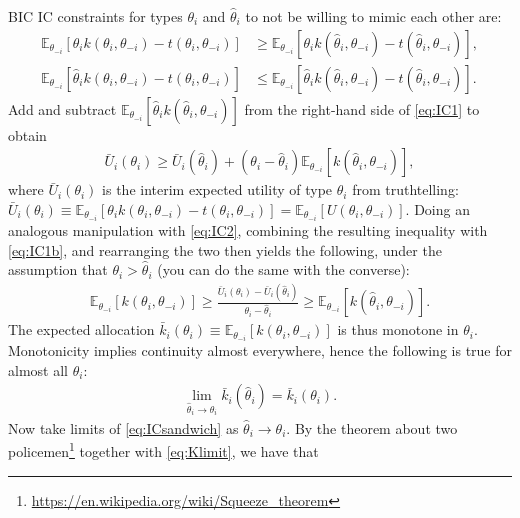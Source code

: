 \documentclass[a4paper]{article}
\begin{document}
	BIC IC constraints for types $\theta_i$ and $\hat{\theta}_i$ to not be willing to mimic each other are:
	\begin{align}
		\mathbb{E}_{\theta_{-i}}\left[ \theta_{i} k(\theta_i,\theta_{-i}) - t(\theta_i,\theta_{-i}) \right] &\geq 
		\mathbb{E}_{\theta_{-i}}\left[ \theta_{i} k(\hat{\theta}_i,\theta_{-i}) - t(\hat{\theta}_i,\theta_{-i}) \right],
		\label{eq:IC1}
		\\
		\mathbb{E}_{\theta_{-i}}\left[ \hat{\theta}_{i} k(\theta_i,\theta_{-i}) - t(\theta_i,\theta_{-i}) \right] &\leq 
		\mathbb{E}_{\theta_{-i}}\left[ \hat{\theta}_{i} k(\hat{\theta}_i,\theta_{-i}) - t(\hat{\theta}_i,\theta_{-i}) \right].
		\label{eq:IC2}
	\end{align}
	Add and subtract $\mathbb{E}_{\theta_{-i}}\left[ \hat{\theta}_{i} k(\hat{\theta}_i,\theta_{-i}) \right]$ from the right-hand side of \eqref{eq:IC1} to obtain
	\begin{align}
		\bar{U}_i(\theta_i) \geq \bar{U}_i(\hat{\theta}_i) + (\theta_i - \hat{\theta}_i) \mathbb{E}_{\theta_{-i}}\left[ k(\hat{\theta}_i,\theta_{-i}) \right], \label{eq:IC1b}
	\end{align}
	where $\bar{U}_i(\theta_i)$ is the interim expected utility of type $\theta_i$ from truthtelling: $\bar{U}_i(\theta_i) \equiv \mathbb{E}_{\theta_{-i}}\left[ \theta_{i} k(\theta_i,\theta_{-i}) - t(\theta_i,\theta_{-i}) \right] = \mathbb{E}_{\theta_{-i}}\left[ U(\theta_i,\theta_{-i}) \right]$.
	Doing an analogous manipulation with \eqref{eq:IC2}, combining the resulting inequality with \eqref{eq:IC1b}, and rearranging the two then yields the following, under the assumption that $\theta_i > \hat{\theta}_i$ (you can do the same with the converse):
	\begin{align}
		\mathbb{E}_{\theta_{-i}}\left[ k(\theta_i,\theta_{-i}) \right] \geq \frac{\bar{U}_i(\theta_i) - \bar{U}_i(\hat{\theta}_i)}{\theta_i - \hat{\theta}_i} \geq \mathbb{E}_{\theta_{-i}}\left[ k(\hat{\theta}_i,\theta_{-i}) \right] .
		\label{eq:ICsandwich}
	\end{align}
	The expected allocation $\bar{k}_i(\theta_i) \equiv \mathbb{E}_{\theta_{-i}}\left[ k(\theta_i,\theta_{-i}) \right]$ is thus monotone in $\theta_i$. Monotonicity implies continuity almost everywhere, hence the following is true for almost all $\theta_i$:
	\begin{align}
		\lim_{\hat{\theta}_i \to \theta_i} \bar{k}_i(\hat{\theta}_i) = \bar{k}_i(\theta_i).
		\label{eq:Klimit}
	\end{align}
	Now take limits of \eqref{eq:ICsandwich} as $\hat{\theta}_i \to \theta_i$. By the theorem about two policemen\footnote{\url{https://en.wikipedia.org/wiki/Squeeze_theorem}} together with \eqref{eq:Klimit}, we have that
\end{document}
